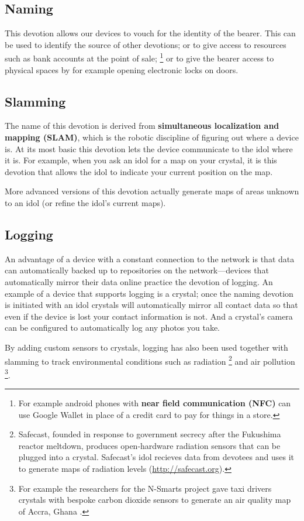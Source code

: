\subsection{Naming} 
%
This devotion allows our devices to vouch for the identity of the bearer. This can be used to identify the source of other devotions; or to give access to resources such as bank accounts at the point of sale;%
\footnote{For example android phones with \textbf{near field communication (NFC)} can use Google Wallet in place of a credit card to pay for things in a store.}
or to give the bearer access to physical spaces by for example opening electronic locks on doors.

\subsection{Slamming} 
%
The name of this devotion is derived from \textbf{simultaneous localization and mapping (SLAM)}, which is the robotic discipline of figuring out where a device is. At its most basic this devotion lets the device communicate to the idol where it is. For example, when you ask an idol for a map on your crystal, it is this devotion that allows the idol to indicate your current position on the map.

More advanced versions of this devotion actually generate maps of areas unknown to an idol (or refine the idol's current maps).

\subsection{Logging} 
%
An advantage of a device with a constant connection to the network is that data can automatically backed up to repositories on the network---devices that automatically mirror their data online practice the devotion of logging. 
An example of a device that supports logging is a crystal; once the naming devotion is initiated with an idol crystals will automatically mirror all contact data so that even if the device is lost your contact information is not. 
And a crystal's camera can be configured to automatically log any photos you take.

By adding custom sensors to crystals, logging has also been used together with slamming to track environmental conditions such as radiation%
\footnote{Safecast, founded in response to government secrecy after the Fukushima reactor meltdown, produces open-hardware radiation sensors that can be plugged into a crystal. Safecast's idol recieves data from devotees and uses it to generate maps of radiation levels (\url{http://safecast.org}).}
and air pollution%
\footnote{For example the researchers for the N-Smarts project gave taxi drivers crystals with bespoke carbon dioxide sensors to generate an air quality map of Accra, Ghana \citep{n-smarts}.}.

